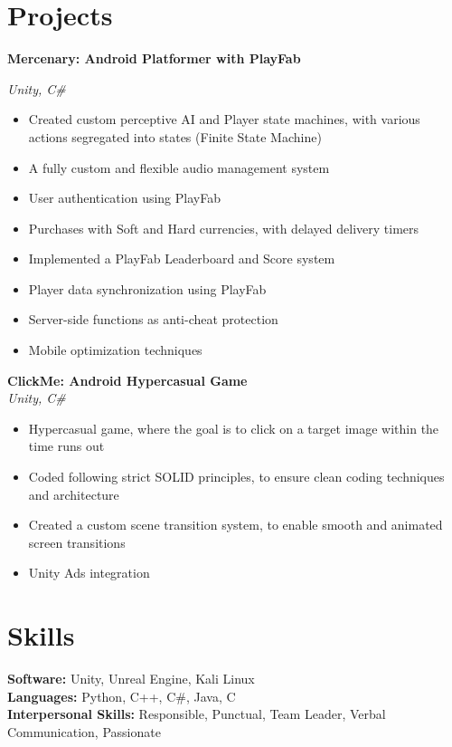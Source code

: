 \documentclass[a4paper,10pt]{article}
\begin{document}
\section*{Projects}
\textbf{Mercenary: Android Platformer with PlayFab} 

\textit{Unity, C\#}

\begin{itemize}

    \item Created custom perceptive AI and Player state machines, with various actions segregated into states (Finite State Machine)
    
    \item A fully custom and flexible audio management system
    
    \item User authentication using PlayFab
    
    \item Purchases with Soft and Hard currencies, with delayed delivery timers
    \item Implemented a PlayFab Leaderboard and Score system
    
    \item Player data synchronization using PlayFab
    \item Server-side functions as anti-cheat protection
    \item Mobile optimization techniques

\end{itemize}

\textbf{ClickMe: Android Hypercasual Game} \\

\textit{Unity, C\#}

\begin{itemize}

    \item Hypercasual game, where the goal is to click on a target image within the time runs out
    
    \item Coded following strict SOLID principles, to ensure clean coding techniques and architecture
    
    \item Created a custom scene transition system, to enable smooth and animated screen transitions
    
    \item Unity Ads integration

\end{itemize}

\section*{Skills}

\textbf{Software:} Unity, Unreal Engine, Kali Linux \\

\textbf{Languages:} Python, C++, C\#, Java, C \\

\textbf{Interpersonal Skills:} Responsible, Punctual, Team Leader, Verbal Communication, Passionate \\
\end{document}
